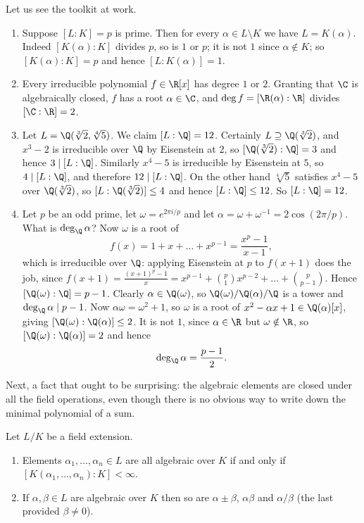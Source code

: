 \begin{example}
	Let us see the toolkit at work.
	\begin{enumerate}[label=(\roman*)]
		\item Suppose $[L:K] = p$ is prime. Then for every $\alpha \in L \setminus K$ we have $L = K(\alpha)$. Indeed $[K(\alpha):K]$ divides $p$, so is $1$ or $p$; it is not $1$ since $\alpha \notin K$; so $[K(\alpha):K] = p$ and hence $[L:K(\alpha)] = 1$.
		\item Every irreducible polynomial $f \in \R[x]$ has degree $1$ or $2$. Granting that $\C$ is algebraically closed, $f$ has a root $\alpha \in \C$, and $\deg f = [\R(\alpha):\R]$ divides $[\C:\R] = 2$.
		\item Let $L = \Q(\sqrt[3]{2}, \sqrt[4]{5})$. We claim $[L:\Q] = 12$. Certainly $L \supseteq \Q(\sqrt[3]2)$, and $x^3 - 2$ is irreducible over $\Q$ by Eisenstein at $2$, so $[\Q(\sqrt[3]2):\Q] = 3$ and hence $3 \mid [L:\Q]$. Similarly $x^4 - 5$ is irreducible by Eisenstein at $5$, so $4 \mid [L:\Q]$, and therefore $12 \mid [L:\Q]$. On the other hand $\sqrt[4]{5}$ satisfies $x^4 - 5$ over $\Q(\sqrt[3]2)$, so $[L : \Q(\sqrt[3]{2})] \leq 4$ and hence $[L:\Q] \leq 12$. So $[L:\Q] = 12$.
		\item Let $p$ be an odd prime, let $\omega = e^{2\pi i/p}$ and let $\alpha = \omega + \omega^{-1} = 2\cos(2\pi/p)$. What is $\deg_\Q \alpha$? Now $\omega$ is a root of
		$$f(x) = 1 + x + \dots + x^{p-1} = \frac{x^p - 1}{x - 1},$$
		which is irreducible over $\Q$: applying Eisenstein at $p$ to $f(x+1)$ does the job, since $f(x+1) = \frac{(x+1)^p - 1}{x} = x^{p-1} + \binom{p}{1}x^{p-2} + \dots + \binom{p}{p-1}$. Hence $[\Q(\omega):\Q] = p - 1$. Clearly $\alpha \in \Q(\omega)$, so $\Q(\omega)/\Q(\alpha)/\Q$ is a tower and $\deg_\Q \alpha \mid p-1$. Now $\alpha \omega = \omega^2 + 1$, so $\omega$ is a root of $x^2 - \alpha x + 1 \in \Q(\alpha)[x]$, giving $[\Q(\omega):\Q(\alpha)] \leq 2$. It is not $1$, since $\alpha \in \R$ but $\omega \notin \R$, so $[\Q(\omega):\Q(\alpha)] = 2$ and hence
		$$\deg_\Q \alpha = \frac{p-1}{2}.$$
	\end{enumerate}
\end{example}

Next, a fact that ought to be surprising: the algebraic elements are closed under all the field operations, even though there is no obvious way to write down the minimal polynomial of a sum.

\begin{corollary}\label{cor:algclosed}
	Let $L/K$ be a field extension.
	\begin{enumerate}[label=(\roman*)]
		\item Elements $\alpha_1, \dots, \alpha_n \in L$ are all algebraic over $K$ if and only if $[K(\alpha_1, \dots, \alpha_n) : K] < \infty$.
		\item If $\alpha, \beta \in L$ are algebraic over $K$ then so are $\alpha \pm \beta$, $\alpha\beta$ and $\alpha/\beta$ (the last provided $\beta \neq 0$).
	\end{enumerate}
\end{corollary}

